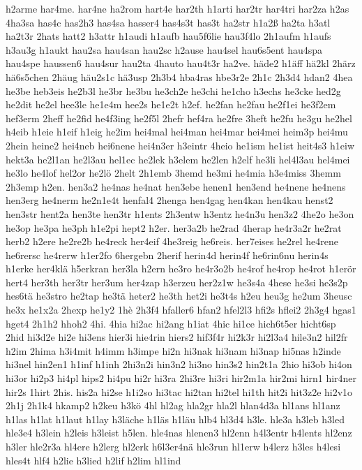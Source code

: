 {h2arme
har4me.
har4ne
ha2rom
hart4e
har2th
h1arti
har2tr
har4tri
har2za
h2as
4ha3sa
has4c
has2h3
has4sa
hasser4
has4s3t
has3t
ha2str
h1a2ß
ha2ta
h3atl
ha2t3r
2hats
hatt2
h3attr
h1audi
h1aufb
hau5f6lie
hau3f4lo
2h1aufm
h1aufs
h3au3g
h1aukt
hau2sa
hau4san
hau2sc
h2ause
hau4sel
hau6s5ent
hau4spa
hau4spe
haussen6
hau4sur
hau2ta
4hauto
hau4t3r
ha2ve.
häde2
h1äff
hä2kl
2härz
hä6s5chen
2häug
häu2s1c
hä3usp
2h3b4
hba4ras
hbe3r2e
2h1c
2h3d4
hdan2
4hea
he3be
heb3eis
he2b3l
he3br
he3bu
he3ch2e
he3chi
he1cho
h3echs
he3cke
hed2g
he2dit
he2el
hee3le
he1e4m
hee2s
he1e2t
h2ef.
he2fan
he2fau
he2f1ei
he3f2em
hef3erm
2heff
he2fid
he4f3ing
he2f5l
2hefr
hef4ra
he2fre
3heft
he2fu
he3gu
he2hel
h4eib
h1eie
h1eif
h1eig
he2im
hei4mal
hei4man
hei4mar
hei4mei
heim3p
hei4mu
2hein
heine2
hei4neb
hei6nene
hei4n3er
h3eintr
4heio
he1ism
he1ist
heit4s3
h1eiw
hekt3a
he2l1an
he2l3au
hel1ec
he2lek
h3elem
he2len
h2elf
he3li
hel4l3au
hel4mei
he3lo
he4lof
hel2or
he2lö
2helt
2h1emb
3hemd
he3mi
he4mia
h3e4miss
3hemm
2h3emp
h2en.
hen3a2
he4nas
he4nat
hen3ebe
henen1
hen3end
he4nene
he4nens
hen3erg
he4nerm
he2n1e4t
henfal4
2henga
hen4gag
hen4kan
hen4kau
henst2
hen3str
hent2a
hen3te
hen3tr
h1ents
2h3entw
h3entz
he4n3u
hen3z2
4he2o
he3on
he3op
he3pa
he3ph
h1e2pi
hept2
h2er.
her3a2b
he2rad
4herap
he4r3a2r
he2rat
herb2
h2ere
he2re2b
he4reck
her4eif
4he3reig
he6reis.
her7eises
he2rel
he4rene
he6rersc
he4rerw
h1er2fo
6hergebn
2herif
herin4d
herin4f
he6rin6nu
herin4s
h1erke
her4klä
h5erkran
her3la
h2ern
he3ro
he4r3o2b
he4rof
he4rop
he4rot
h1erör
hert4
her3th
her3tr
her3um
her4zap
h3erzeu
her2z1w
he3s4a
4hese
he3si
he3s2p
hes6tä
he3stro
he2tap
he3tä
heter2
he3th
het2i
he3t4s
h2eu
heu3g
he2um
3heusc
he3x
he1x2a
2hexp
he1y2
1hè
2h3f4
hfaller6
hfan2
hfel2l3
hfi2s
hflei2
2h3g4
hgas1
hget4
2h1h2
hhoh2
4hi.
4hia
hi2ac
hi2ang
h1iat
4hic
hi1ce
hich6t5er
hicht6sp
2hid
hi3d2e
hi2e
hi3ens
hier3i
hie4rin
hiers2
hif3f4r
hi2k3r
hi2l3a4
hile3n2
hil2fr
h2im
2hima
h3i4mit
h4imm
h3impe
hi2n
hi3nak
hi3nam
hi3nap
hi5nas
h2inde
hi3nel
hin2en1
h1inf
h1inh
2hi3n2i
hin3n2
hi3no
hin3s2
hin2t1a
2hio
hi3ob
hi4on
hi3or
hi2p3
hi4pl
hips2
hi4pu
hi2r
hi3ra
2hi3re
hi3ri
hir2m1a
hir2mi
hirn1
hir4ner
hir2s
1hirt
2his.
his2a
hi2se
h1i2so
hi3tac
hi2tan
hi2tel
hi1th
hit2i
hit3z2e
hi2v1o
2h1j
2h1k4
hkamp2
h2keu
h3kö
4hl
hl2ag
hla2gr
hla2l
hlan4d3a
hl1ans
hl1anz
h1las
h1lat
h1laut
h1lay
h3läche
h1läs
h1läu
hlb4
hl3d4
h3le.
hle3a
h3leb
h3led
hle3e4
h3lein
h2leis
h3leist
h5len.
hle4nas
hlenen3
hl2enn
h4l3entr
h4lents
hl2enz
h3ler
hle2r3a
hl4ere
h2lerg
hl2erk
h6l3er4nä
hle3run
hl1erw
h4lerz
h3les
h4lesi
hles4t
hlf4
h2lie
h3lied
h2lif
h2lim
hl1ind
}
